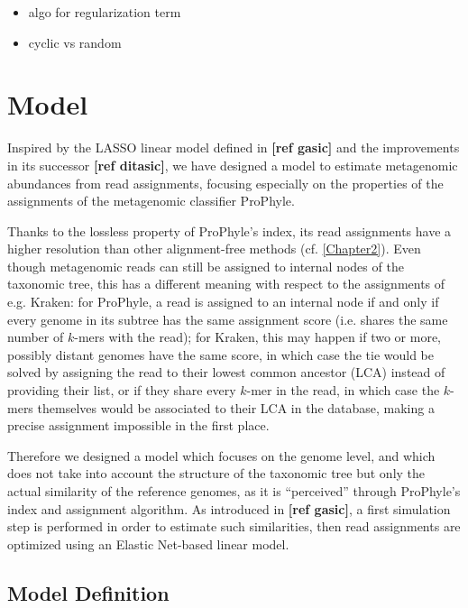 \begin{itemize}
    \item algo for regularization term
    \item cyclic vs random
\end{itemize}

\section{Model}

Inspired by the LASSO linear model defined in \textbf{[ref gasic]} and the improvements in its successor \textbf{[ref ditasic]}, we have designed a model to estimate metagenomic abundances from read assignments, focusing especially on the properties of the assignments of the metagenomic classifier ProPhyle.

Thanks to the lossless property of ProPhyle's index, its read assignments have a higher resolution than other alignment-free methods (cf. \ref{Chapter2}). Even though metagenomic reads can still be assigned to internal nodes of the taxonomic tree, this has a different meaning with respect to the assignments of e.g. Kraken: for ProPhyle, a read is assigned to an internal node if and only if every genome in its subtree has the same assignment score (i.e. shares the same number of $k$-mers with the read); for Kraken, this may happen if two or more, possibly distant genomes have the same score, in which case the tie would be solved by assigning the read to their lowest common ancestor (LCA) instead of providing their list, or if they share every $k$-mer in the read, in which case the $k$-mers themselves would be associated to their LCA in the database, making a precise assignment impossible in the first place.

Therefore we designed a model which focuses on the genome level, and which does not take into account the structure of the taxonomic tree but only the actual similarity of the reference genomes, as it is ``perceived'' through ProPhyle's index and assignment algorithm. As introduced in \textbf{[ref gasic]}, a first simulation step is performed in order to estimate such similarities, then read assignments are optimized using an Elastic Net-based linear model.

\subsection{Model Definition}

